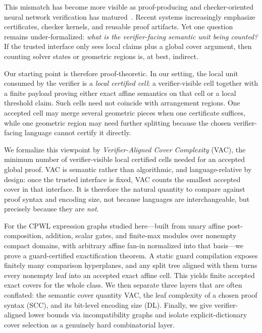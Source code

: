 \documentclass{article}
\begin{document}
This mismatch has become more visible as proof-producing and checker-oriented neural network verification has matured~\cite{Isac2022ProofProduction,Fischer2022SharedCertificates,Desmartin2025ImandraChecker,Duong2025APTP}. Recent systems increasingly emphasize certificates, checker kernels, and reusable proof artifacts. Yet one question remains under-formalized: \emph{what is the verifier-facing semantic unit being counted?} If the trusted interface only sees local claims plus a global cover argument, then counting solver states or geometric regions is, at best, indirect.

Our starting point is therefore proof-theoretic. In our setting, the local unit consumed by the verifier is a \emph{local certified cell}: a verifier-visible cell together with a finite payload proving either exact affine semantics on that cell or a local threshold claim. Such cells need not coincide with arrangement regions. One accepted cell may merge several geometric pieces when one certificate suffices, while one geometric region may need further splitting because the chosen verifier-facing language cannot certify it directly.

We formalize this viewpoint by \emph{Verifier-Aligned Cover Complexity} (VAC), the minimum number of verifier-visible local certified cells needed for an accepted global proof. VAC is semantic rather than algorithmic, and language-relative by design: once the trusted interface is fixed, VAC counts the smallest accepted cover in that interface. It is therefore the natural quantity to compare against proof syntax and encoding size, not because languages are interchangeable, but precisely because they are \emph{not}.

For the CPWL expression graphs studied here---built from unary affine post-composition, addition, scalar gates, and finite-max modules over nonempty compact domains, with arbitrary affine fan-in normalized into that basis---we prove a guard-certified exactification theorem. A static guard compilation exposes finitely many comparison hyperplanes, and any split tree aligned with them turns every nonempty leaf into an accepted exact affine cell. This yields finite accepted exact covers for the whole class. We then separate three layers that are often conflated: the semantic cover quantity VAC, the leaf complexity of a chosen proof syntax (SCC), and its bit-level encoding size (DL). Finally, we give verifier-aligned lower bounds via incompatibility graphs and isolate explicit-dictionary cover selection as a genuinely hard combinatorial layer.
\end{document}

